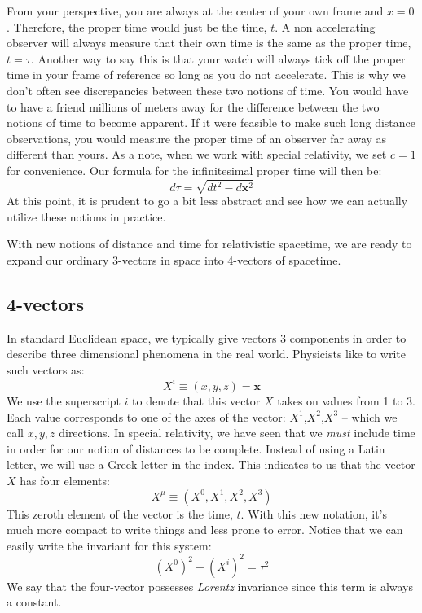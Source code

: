 From your perspective, you are always at the center of your own frame and $x=0$. Therefore, the proper time would just be the time, $t$. A non accelerating observer will always measure that their own time is the same as the proper time, $t=\tau$. Another way to say this is that your watch will always tick off the proper time in your frame of reference so long as you do not accelerate. This is why we don't often see discrepancies between these two notions of time. You would have to have a friend millions of meters away for the difference between the two notions of time to become apparent. If it were feasible to make such long distance observations, you would measure the proper time of an observer far away as different than yours. As a note, when we work with special relativity, we set $c=1$ for convenience. Our formula for the infinitesimal proper time will then be:
\begin{equation}\label{eq:dtau}
d\tau=\sqrt{dt^2-d\bm{x}^2}
\end{equation}
At this point, it is prudent to go a bit less abstract and see how we can actually utilize these notions in practice.

With new notions of distance and time for relativistic spacetime, we are ready to expand our ordinary 3-vectors in space into 4-vectors of spacetime.

\subsection{4-vectors}

In standard Euclidean space, we typically give vectors 3 components in order to describe three dimensional phenomena in the real world. Physicists like to write such vectors as:
$$X^i\equiv(x,y,z)=\bm{x}$$
We use the superscript $i$ to denote that this vector $X$ takes on values from 1 to 3. Each value corresponds to one of the axes of the vector: $X^1$,$X^2$,$X^3$ -- which we call $x,y,z$ directions. In special relativity, we have seen that we \textit{must} include time in order for our notion of distances to be complete. Instead of using a Latin letter, we will use a Greek letter in the index. This indicates to us that the vector $X$ has four elements:
$$X^\mu\equiv(X^0,X^1,X^2,X^3)$$
This zeroth element of the vector is the time, $t$. With this new notation, it's much more compact to write things and less prone to error. Notice that we can easily write the invariant for this system:
$$(X^0)^2-(X^i)^2=\tau^2$$
We say that the four-vector possesses \textit{Lorentz} invariance since this term is always a constant.

